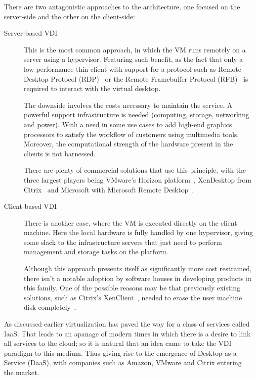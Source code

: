 There are two antagonistic approaches to the architecture, one focused on the server-side and the other on the client-side:

\begin{description}
	\item [Server-based VDI] This is the most common approach, in which the VM runs remotely on a server using a hypervisor. Featuring such benefit, as the fact that only a low-performance thin client with support for a protocol such as Remote Desktop Protocol (RDP)~\cite{Microsoft_RDP} or the Remote Framebuffer Protocol (RFB)~\cite{rfc6143} is required to interact with the virtual desktop.

		The downside involves the costs necessary to maintain the service. A powerful support infrastructure is needed (computing, storage, networking and power). With a need in some use cases to add high-end graphics processors to satisfy the workflow of customers using multimedia tools. Moreover, the computational strength of the hardware present in the clients is not harnessed. 

		There are plenty of commercial solutions that use this principle, with the three largest players being VMware's Horizon platform~\cite{VMware_horizon}, XenDesktop from Citrix~\cite{Citrix_XenDesktop} and Microsoft with Microsoft Remote Desktop~\cite{Microsoft_RDS}.
	\newpage
	\item [Client-based VDI] There is another case, where the VM is executed directly on the client machine. Here the local hardware is fully handled by one hypervisor, giving some slack to the infrastructure servers that just need to perform management and storage tasks on the platform.

		Although this approach presents itself as significantly more cost restrained, there isn't a notable adoption by software houses in developing products in this family. One of the possible reasons may be that previously existing solutions, such as Citrix's XenClient~\cite{Citrix_XenDesktop}, needed to erase the user machine disk completely~\cite{VMblog_Citrix}.
\end{description}

As discussed earlier virtualization has paved the way for a class of services called IaaS. That leads to an apanage of modern times in which there is a desire to link all services to the cloud; so it is natural that an idea came to take the VDI paradigm to this medium. Thus giving rise to the emergence of Desktop as a Service (DaaS), with companies such as Amazon, VMware and Citrix entering the market.

